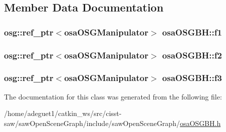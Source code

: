 \subsection{Member Data Documentation}
\hypertarget{classosa_o_s_g_b_h_a836e1fcb735edb2527ab520e5bf0f34f}{
\subsubsection[{f1}]{\setlength{\rightskip}{0pt plus 5cm}osg\-::ref\-\_\-ptr$<${\bf osa\-O\-S\-G\-Manipulator}$>$ osa\-O\-S\-G\-B\-H\-::f1\hspace{0.3cm}{\ttfamily [protected]}}}\label{classosa_o_s_g_b_h_a836e1fcb735edb2527ab520e5bf0f34f}
\hypertarget{classosa_o_s_g_b_h_a46d2249c302d3056e4758fe9ad2fd61c}{
\subsubsection[{f2}]{\setlength{\rightskip}{0pt plus 5cm}osg\-::ref\-\_\-ptr$<${\bf osa\-O\-S\-G\-Manipulator}$>$ osa\-O\-S\-G\-B\-H\-::f2\hspace{0.3cm}{\ttfamily [protected]}}}\label{classosa_o_s_g_b_h_a46d2249c302d3056e4758fe9ad2fd61c}
\hypertarget{classosa_o_s_g_b_h_a3f1f482d0c054f21e42116d809a9c1b4}{
\subsubsection[{f3}]{\setlength{\rightskip}{0pt plus 5cm}osg\-::ref\-\_\-ptr$<${\bf osa\-O\-S\-G\-Manipulator}$>$ osa\-O\-S\-G\-B\-H\-::f3\hspace{0.3cm}{\ttfamily [protected]}}}\label{classosa_o_s_g_b_h_a3f1f482d0c054f21e42116d809a9c1b4}


The documentation for this class was generated from the following file\-:\begin{DoxyCompactItemize}
\item 
/home/adeguet1/catkin\-\_\-ws/src/cisst-\/saw/saw\-Open\-Scene\-Graph/include/saw\-Open\-Scene\-Graph/\hyperlink{osa_o_s_g_b_h_8h}{osa\-O\-S\-G\-B\-H.\-h}\end{DoxyCompactItemize}
